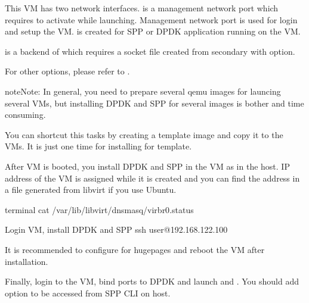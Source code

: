 \documentclass[a4paper,11pt,openany,oneside,english]{sphinxmanual}
\begin{document}
This VM has two network interfaces.
 is a management network port
which requires  to activate while launching.
Management network port is used for login and setup the VM.
 is created for SPP or DPDK application
running on the VM.

 is a backend of  which requires
a socket file  created from secondary with 
option.

For other options, please refer to
.

\begin{sphinxadmonition}{note}{Note:}
In general, you need to prepare several qemu images for launcing
several VMs, but installing DPDK and SPP for several images is bother
and time consuming.

You can shortcut this tasks by creating a template image and copy it
to the VMs. It is just one time for installing for template.
\end{sphinxadmonition}

After VM is booted, you install DPDK and SPP in the VM as in the host.
IP address of the VM is assigned while it is created and you can find
the address in a file generated from libvirt if you use Ubuntu.

\begin{sphinxVerbatim}[commandchars=\\\{\},formatcom=\footnotesize]
 terminal 
 cat /var/lib/libvirt/dnsmasq/virbr0.status
\PYG{g+go}{[}

 Login VM, install DPDK and SPP
 ssh user@192.168.122.100
\end{sphinxVerbatim}

It is recommended to configure  for hugepages and
reboot the VM after installation.

Finally, login to the VM, bind ports to DPDK and launch 
and .
You should add  option to be accessed from SPP CLI on host.
\end{document}
